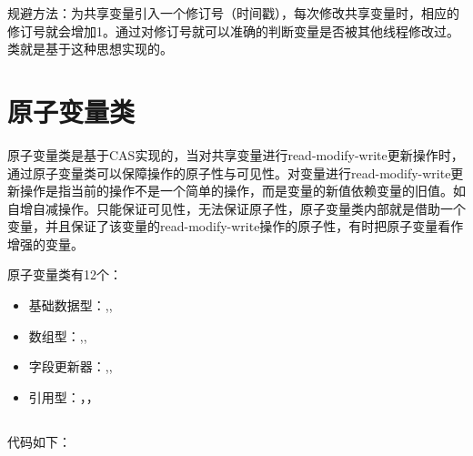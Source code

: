 \documentclass[a4paper]{report}
\begin{document}
规避方法：为共享变量引入一个修订号（时间戳），每次修改共享变量时，相应的修订号就会增加1。通过对修订号就可以准确的判断变量是否被其他线程修改过。类就是基于这种思想实现的。
\section{原子变量类}
原子变量类是基于CAS实现的，当对共享变量进行read-modify-write更新操作时，通过原子变量类可以保障操作的原子性与可见性。对变量进行read-modify-write更新操作是指当前的操作不是一个简单的操作，而是变量的新值依赖变量的旧值。如自增自减操作。只能保证可见性，无法保证原子性，原子变量类内部就是借助一个变量，并且保证了该变量的read-modify-write操作的原子性，有时把原子变量看作增强的变量。

原子变量类有12个：
\begin{itemize}
  \item 基础数据型：,,
  \item 数组型：,,
  \item 字段更新器：,,
  \item 引用型：，，
\end{itemize}
\subsection{}
代码如下：
\end{document}
